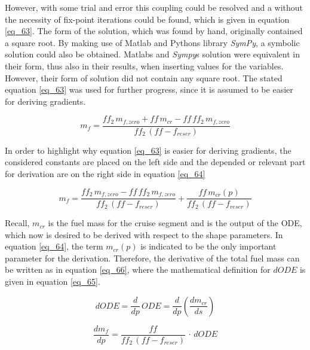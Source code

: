 \vspace{0.17cm}
However, with some trial and error this coupling could be resolved 
and a without the necessity of fix-point 
iterations could be found, which is given in equation 
\eqref{eq_63}. The form of the solution, which was found by 
hand, originally contained a  square root. By making use of 
Matlab and Pythons library \emph{SymPy}, a symbolic solution 
could also be obtained. Matlabs and \emph{Sympy}s solution 
were equivalent in their form, thus also in their results, when 
inserting values for the variables. However, their form 
of solution did not contain any square root. 
The stated equation \eqref{eq_63} was used for further 
progress, since it is assumed to be easier for 
deriving gradients.

\begin{equation}
    \label{eq_63}
    m_f = \dfrac{ff_2 \, m_{f, zero} + ff \, m_{cr} - ff \, ff_2 \, m_{f, zero}}
    {ff_2 \, (ff - f_{reser})}
\end{equation}

In order to highlight why equation \eqref{eq_63} is easier
for deriving gradients, the  considered constants are
placed on the left side and the depended or relevant part 
for derivation are on the right side in equation 
\eqref{eq_64} 

\begin{equation}
    \label{eq_64}
    m_f = \dfrac{ff_2 \, m_{f, zero}  - ff \, ff_2 \, m_{f, zero}}
    {ff_2 \, (ff - f_{reser})} + \dfrac{ff \, m_{cr}(p)}{ff_2 \, (ff - f_{reser})} 
\end{equation}

Recall, $m_{cr}$ is the fuel mass for the cruise segment 
and is the output of the ODE, which now is 
desired to be derived with respect to the shape 
parameters. In equation \eqref{eq_64}, the term 
$m_{cr}(p)$ is indicated to be the only important 
parameter for the derivation. Therefore, the 
derivative of the total fuel mass can 
be written as in equation \eqref{eq_66}, where
the mathematical definition for $dODE$ is given 
in equation \eqref{eq_65}.

\begin{equation}
    \label{eq_65}
    dODE = \frac{d}{dp}\, ODE = \frac{d}{dp}\left(\dfrac{dm_{cr}}{ds}\right)
\end{equation}

\begin{equation}
    \label{eq_66}
    \frac{dm_f}{dp}= 
    \dfrac{ff}{ff_2 \, (ff - f_{reser})} \, \cdot \, dODE
\end{equation}


